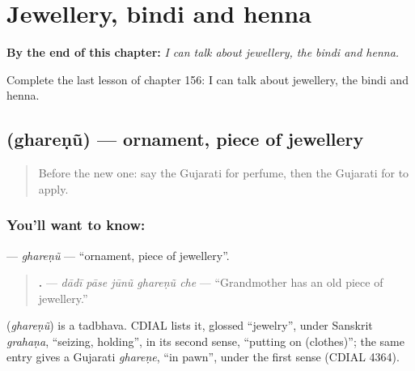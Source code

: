 
\chapter{Jewellery, bindi and henna}
\label{ch:gu-jewellery-bindi-and-henna}

\begin{chapteropening}
\textbf{By the end of this chapter:} \emph{I can talk about jewellery, the bindi and henna.}

Complete the last lesson of chapter 156: I can talk about jewellery, the bindi and henna.
\end{chapteropening}

\section[\texorpdfstring{\gu{ઘરેણું} (ghareṇũ)}{ઘરેણું (ghareṇũ)}]{ (ghareṇũ) — ornament, piece of jewellery}

\label{lesson:GU-C156-gharenu}



\begin{quote}
Before the new one: say the Gujarati for perfume, then the Gujarati for to apply.
\end{quote}

\subsection*{You'll want to know: }
\textbf{} — \emph{ghareṇũ} — \textquotedblleft{}ornament, piece of jewellery\textquotedblright{}.

\begin{quote}
\textbf{    .} — \emph{dādī pāse jūnũ ghareṇũ che} — \textquotedblleft{}Grandmother has an old piece of jewellery.\textquotedblright{}
\end{quote}

\begin{cousinweb}
\textbf{} (\emph{ghareṇũ}) is a tadbhava. CDIAL lists it, glossed \textquotedblleft{}jewelry\textquotedblright{}, under Sanskrit \emph{grahaṇa}, \textquotedblleft{}seizing, holding\textquotedblright{}, in its second sense, \textquotedblleft{}putting on (clothes)\textquotedblright{}; the same entry gives a Gujarati \emph{ghareṇe}, \textquotedblleft{}in pawn\textquotedblright{}, under the first sense (CDIAL 4364).
\end{cousinweb}

